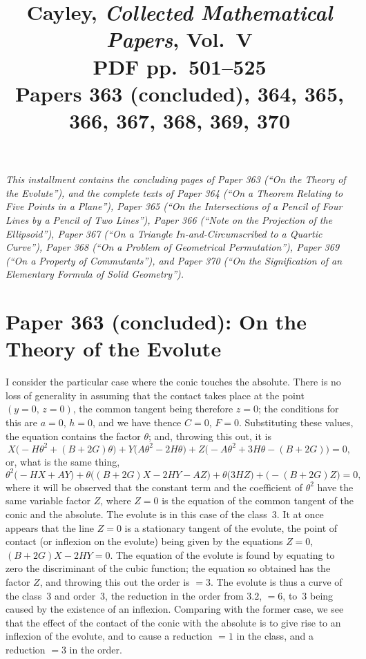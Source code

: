 \documentclass[11pt]{article}
\title{Cayley, \emph{Collected Mathematical Papers}, Vol.~V\\
PDF pp.\ 501--525\\
Papers 363 (concluded), 364, 365, 366, 367, 368, 369, 370}
\author{}
\date{}
\begin{document}
\maketitle

\noindent\textit{This installment contains the concluding pages of Paper 363 (``On the Theory of the Evolute''), and the complete texts of Paper 364 (``On a Theorem Relating to Five Points in a Plane''), Paper 365 (``On the Intersections of a Pencil of Four Lines by a Pencil of Two Lines''), Paper 366 (``Note on the Projection of the Ellipsoid''), Paper 367 (``On a Triangle In-and-Circumscribed to a Quartic Curve''), Paper 368 (``On a Problem of Geometrical Permutation''), Paper 369 (``On a Property of Commutants''), and Paper 370 (``On the Signification of an Elementary Formula of Solid Geometry'').}

\bigskip

\section*{Paper 363 (concluded): On the Theory of the Evolute}

\medskip{}

\medskip
I consider the particular case where the conic touches the absolute. There is no loss of generality in assuming that the contact takes place at the point $(y=0,\, z=0)$, the common tangent being therefore $z=0$; the conditions for this are $a=0$, $h=0$, and we have thence $C=0$, $F=0$. Substituting these values, the equation contains the factor $\theta$; and, throwing this out, it is
\[
X\bigl(-H\theta^{2} + (B+2G)\theta\bigr)
+ Y\bigl(A\theta^{2} - 2H\theta\bigr)
+ Z\bigl(-A\theta^{2} + 3H\theta - (B+2G)\bigr) = 0,
\]
or, what is the same thing,
\[
\theta^{2}\bigl(-HX + AY\bigr)
+ \theta\bigl((B+2G)X - 2HY - AZ\bigr)
+ \theta\bigl(3HZ\bigr)
+ \bigl(-(B+2G)Z\bigr) = 0,
\]
where it will be observed that the constant term and the coefficient of $\theta^{2}$ have the same variable factor $Z$, where $Z=0$ is the equation of the common tangent of the conic and the absolute. The evolute is in this case of the class~3. It at once appears that the line $Z=0$ is a stationary tangent of the evolute, the point of contact (or inflexion on the evolute) being given by the equations $Z=0$, $(B+2G)X - 2HY = 0$. The equation of the evolute is found by equating to zero the discriminant of the cubic function; the equation so obtained has the factor $Z$, and throwing this out the order is $=3$. The evolute is thus a curve of the class~3 and order~3, the reduction in the order from $3.2$, $=6$, to~3 being caused by the existence of an inflexion. Comparing with the former case, we see that the effect of the contact of the conic with the absolute is to give rise to an inflexion of the evolute, and to cause a reduction $=1$ in the class, and a reduction $=3$ in the order.
\end{document}
